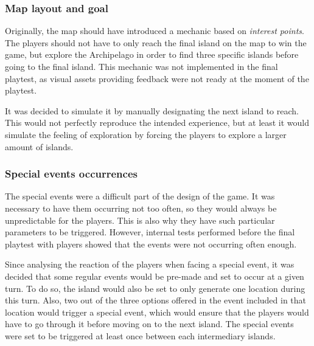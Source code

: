 \subsubsection{Map layout and goal}
Originally, the map should have introduced a mechanic based on \textit{interest points}. The players should not have to only reach the final island on the map to win the game, but explore the Archipelago in order to find three specific islands before going to the final island. This mechanic was not implemented in the final playtest, as visual assets providing feedback were not ready at the moment of the playtest.

It was decided to simulate it by manually designating the next island to reach. This would not perfectly reproduce the intended experience, but at least it would simulate the feeling of exploration by forcing the players to explore a larger amount of islands.

\subsubsection{Special events occurrences}
The special events were a difficult part of the design of the game. It was necessary to have them occurring not too often, so they would always be unpredictable for the players. This is also why they have such particular parameters to be triggered. However, internal tests performed before the final playtest with players showed that the events were not occurring often enough. 

Since analysing the reaction of the players when facing a special event, it was decided that some regular events would be pre-made and set to occur at a given turn. To do so, the island would also be set to only generate one location during this turn. Also, two out of the three options offered in the event included in that location would trigger a special event, which would ensure that the players would have to go through it before moving on to the next island. The special events were set to be triggered at least once between each intermediary islands.

